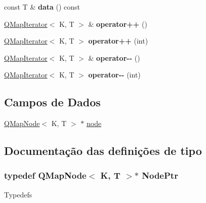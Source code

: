\begin{DoxyCompactItemize}
\item 
\hypertarget{class_q_map_iterator_ad6b649d981086e75f241ff939f275e14}{const T \& {\bfseries data} () const }\label{class_q_map_iterator_ad6b649d981086e75f241ff939f275e14}

\item 
\hypertarget{class_q_map_iterator_ab184aa8c1bf5b762b268fd68fac984eb}{\hyperlink{class_q_map_iterator}{Q\-Map\-Iterator}$<$ K, T $>$ \& {\bfseries operator++} ()}\label{class_q_map_iterator_ab184aa8c1bf5b762b268fd68fac984eb}

\item 
\hypertarget{class_q_map_iterator_aaa3cc0a090e9e2422d6fe5e2e7def73d}{\hyperlink{class_q_map_iterator}{Q\-Map\-Iterator}$<$ K, T $>$ {\bfseries operator++} (int)}\label{class_q_map_iterator_aaa3cc0a090e9e2422d6fe5e2e7def73d}

\item 
\hypertarget{class_q_map_iterator_ad9dd15a7f752da799e1ba0504fc02041}{\hyperlink{class_q_map_iterator}{Q\-Map\-Iterator}$<$ K, T $>$ \& {\bfseries operator-\/-\/} ()}\label{class_q_map_iterator_ad9dd15a7f752da799e1ba0504fc02041}

\item 
\hypertarget{class_q_map_iterator_ada88e0f73d5156e045c172fb1fb361d5}{\hyperlink{class_q_map_iterator}{Q\-Map\-Iterator}$<$ K, T $>$ {\bfseries operator-\/-\/} (int)}\label{class_q_map_iterator_ada88e0f73d5156e045c172fb1fb361d5}

\end{DoxyCompactItemize}
\subsection*{Campos de Dados}
\begin{DoxyCompactItemize}
\item 
\hyperlink{struct_q_map_node}{Q\-Map\-Node}$<$ K, T $>$ $\ast$ \hyperlink{class_q_map_iterator_a0d092ec36e1f2df9021f48435414fe69}{node}
\end{DoxyCompactItemize}


\subsection{Documentação das definições de tipo}
\hypertarget{class_q_map_iterator_af69493335fdffece95c987f0054ab47e}{
\subsubsection[{Node\-Ptr}]{\setlength{\rightskip}{0pt plus 5cm}typedef {\bf Q\-Map\-Node}$<$ K, T $>$$\ast$ {\bf Node\-Ptr}}}\label{class_q_map_iterator_af69493335fdffece95c987f0054ab47e}
Typedefs 

